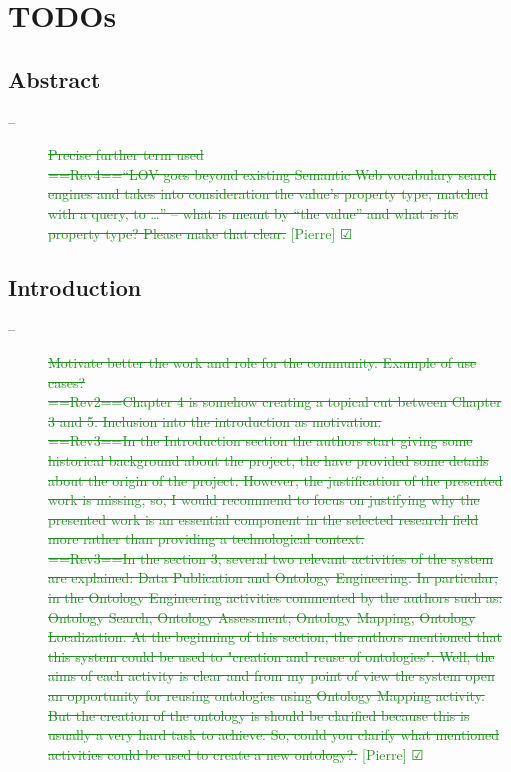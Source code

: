 \documentclass[a4paper,notitlepage]{article}
\newcommand\done[2]{ \item[--]\textcolor{ForestGreen}{\st{#1}} \hfill\textcolor{ForestGreen}{[#2] $\CheckedBox$}}%
\begin{document}
\section{TODOs}

\subsection{Abstract}
\begin{description}
 \done{Precise further term used\\
==Rev4==“LOV goes beyond existing Semantic Web vocabulary search engines and takes into consideration the value’s property type, matched with a query, to …” – what is meant by “the value” and what is its property type? Please make that clear.}{Pierre}
\end{description}


\subsection{Introduction}
\begin{description}
 \done{Motivate better the work and role for the community. Example of use cases?\\
==Rev2==Chapter 4 is somehow creating a topical cut between Chapter 3 and 5. Inclusion into the introduction as motivation.\\
==Rev3==In the Introduction section the authors start giving some historical background about the project, the have provided some details about the origin of the project. However, the justification of the presented work is missing, so, I would recommend to focus on justifying why the presented work is an essential component in the selected research field more rather than providing a technological context.\\
==Rev3==In the section 3, several two relevant activities of the system are explained: Data Publication and Ontology Engineering. In particular, in the Ontology Engineering activities commented by the authors such as: Ontology Search, Ontology Assessment, Ontology Mapping, Ontology Localization. At the beginning of this section, the authors mentioned that this system could be used to "creation and reuse of ontologies". Well, the aims of each activity is clear and from my point of view the system open an opportunity for reusing ontologies using Ontology Mapping activity. But the creation of the ontology is should be clarified because this is usually a very hard task to achieve. So, could you clarify what mentioned activities could be used to create a new ontology?.}{Pierre}
\end{description}
\end{document}
